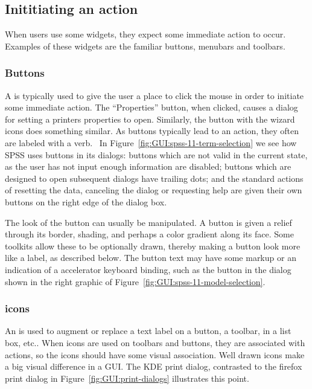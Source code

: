 \subsection{Inititiating an action}

When users use some widgets, they expect some immediate action to
occur. Examples of these widgets are the familiar buttons, menubars
and toolbars. 


\subsubsection{Buttons}
\label{sec:GUI:buttons}

A  is typically used to give the user a place to click the
mouse in order to initiate some immediate action. The ``Properties''
button, when clicked, causes a dialog for setting a printers
properties to open. Similarly, the button with the wizard icons does
something similar.  As buttons typically lead to an action, they often
are labeled with a verb.~\citep{APPLE:HIG} In
Figure~\ref{fig:GUI:spss-11-term-selection} we see how SPSS uses
buttons in its dialogs: buttons which are not valid in the current
state, as the user has not input enough information are disabled;
buttons which are designed to open subsequent dialogs have trailing
dots; and the standard actions of resetting the data, canceling the
dialog or requesting help are given their own buttons on the right
edge of the dialog box.


The look of the button can usually be manipulated.  A button is given
a relief through its border, shading, and perhaps a color gradient
along its face. Some toolkits allow these to be optionally drawn,
thereby making a button look more like a label, as described below.
The button text may have some markup or an indication of a accelerator
keyboard binding, such as the  button
in the dialog shown in the right graphic of
Figure~\ref{fig:GUI:spss-11-model-selection}.

\subsubsection{icons}
\label{sec:GUI:icons}
An  is used to augment or replace a text label on a button,
a toolbar, in a list box, etc.. When icons are used on toolbars and
buttons, they are associated with actions, so the icons should have
some visual association.  Well drawn icons make a big visual
difference in a GUI. The KDE print dialog, contrasted to the firefox
print dialog in Figure~\ref{fig:GUI:print-dialogs} illustrates this
point.

